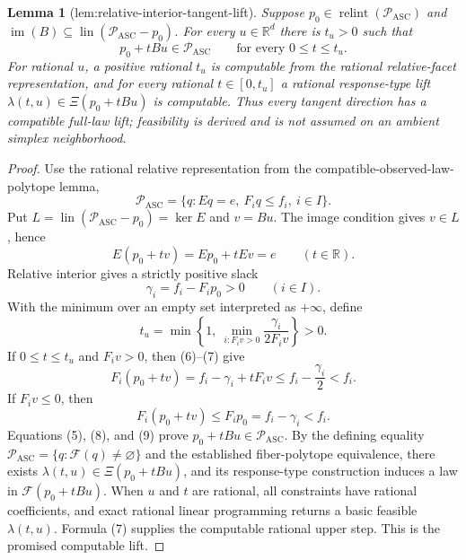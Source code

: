 \documentclass{article}
\newtheorem{lemma}{Lemma}
\begin{document}
\begin{lemma}[lem:relative-interior-tangent-lift]\label{lem:relative-interior-tangent-lift}
Suppose \(p_0\in\operatorname{relint}(\mathcal P_{\mathrm{ASC}})\) and \(\operatorname{im}(B)\subseteq\operatorname{lin}(\mathcal P_{\mathrm{ASC}}-p_0)\).  For every \(u\in\mathbb R^d\) there is \(t_u>0\) such that
\[
 p_0+tBu\in\mathcal P_{\mathrm{ASC}}
 \qquad\text{for every }0\le t\le t_u.
\]
For rational \(u\), a positive rational \(t_u\) is computable from the rational relative-facet representation, and for every rational \(t\in[0,t_u]\) a rational response-type lift \(\lambda(t,u)\in\Xi(p_0+tBu)\) is computable.  Thus every tangent direction has a compatible full-law lift; feasibility is derived and is not assumed on an ambient simplex neighborhood.
\end{lemma}
\begin{proof}
Use the rational relative representation from the compatible-observed-law-polytope lemma,
\[
 \mathcal P_{\mathrm{ASC}}=\{q:Eq=e,\ F_iq\le f_i,\ i\in I\}.
\]
Put \(L=\operatorname{lin}(\mathcal P_{\mathrm{ASC}}-p_0)=\ker E\) and \(v=Bu\).  The image condition gives \(v\in L\), hence
\[
 E(p_0+tv)=Ep_0+tEv=e \qquad(t\in\mathbb R). \tag{5}
\]
Relative interior gives a strictly positive slack
\[
 \gamma_i=f_i-F_ip_0>0\qquad(i\in I). \tag{6}
\]
With the minimum over an empty set interpreted as \(+\infty\), define
\[
 t_u=\min\left\{1,\ \min_{i:F_iv>0}\frac{\gamma_i}{2F_iv}\right\}>0. \tag{7}
\]
If \(0\le t\le t_u\) and \(F_iv>0\), then (6)--(7) give
\[
 F_i(p_0+tv)
 =f_i-\gamma_i+tF_iv
 \le f_i-\frac{\gamma_i}{2}<f_i. \tag{8}
\]
If \(F_iv\le0\), then
\[
 F_i(p_0+tv)\le F_ip_0=f_i-\gamma_i<f_i. \tag{9}
\]
Equations (5), (8), and (9) prove \(p_0+tBu\in\mathcal P_{\mathrm{ASC}}\).  By the defining equality \(\mathcal P_{\mathrm{ASC}}=\{q:\mathcal F(q)\ne\varnothing\}\) and the established fiber-polytope equivalence, there exists \(\lambda(t,u)\in\Xi(p_0+tBu)\), and its response-type construction induces a law in \(\mathcal F(p_0+tBu)\).  When \(u\) and \(t\) are rational, all constraints have rational coefficients, and exact rational linear programming returns a basic feasible \(\lambda(t,u)\).  Formula (7) supplies the computable rational upper step.  This is the promised computable lift.
\end{proof}
\end{document}
